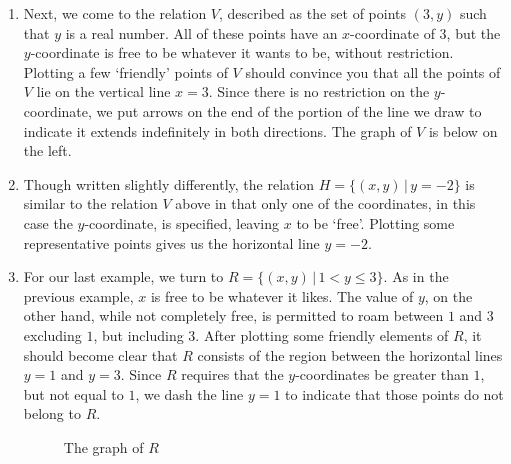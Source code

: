 {\begin{enumerate}

\item  Next, we come to the relation $V$,  described as the set of points $(3,y)$ such that $y$ is a real number.  All of these points have an $x$-coordinate of $3$, but the $y$-coordinate is free to be whatever it wants to be, without restriction.  Plotting a few `friendly' points of $V$ should convince you that all the points of $V$ lie on the vertical line $x = 3$.  Since there is no restriction on the $y$-coordinate, we put arrows on the end of the portion of the line we draw to indicate it extends indefinitely in both directions.  The graph of $V$ is below on the left.

\item  Though written slightly differently, the relation $H = \{ (x,y) \, | \, y = -2 \}$ is similar to the relation $V$ above in that only one of the coordinates, in this case the $y$-coordinate, is specified, leaving $x$ to be `free'.  Plotting some representative points gives us the horizontal line $y=-2$.




\item  For our last example, we turn to $R = \{ (x,y) \, | \, 1 < y \leq 3 \}$.  As in the previous example, $x$ is free to be whatever it likes. The value of $y$, on the other hand, while not completely free, is permitted to roam between $1$ and $3$ excluding $1$, but including $3$. After plotting some friendly elements of $R$, it should become clear that $R$ consists of the region between the horizontal lines $y = 1$ and $y = 3$.  Since $R$ requires that the $y$-coordinates be greater than $1$, but not equal to $1$, we dash the line $y = 1$ to indicate that those points do not belong to $R$. 
\begin{center}
\begin{figure}[h]
\caption{The graph of $R$}
\end{figure}
\end{center}



\end{enumerate}}
